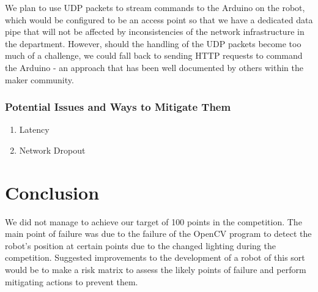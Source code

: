 \documentclass{article}
\begin{document}
We plan to use UDP packets to stream commands to the Arduino on the robot, which would be configured to be an access point so that we have a dedicated data pipe that will not be affected by inconsistencies of the network infrastructure in the department. However, should the handling of the UDP packets become too much of a challenge, we could fall back to sending HTTP requests to command the Arduino - an approach that has been well documented by others within the maker community.

\subsubsection{Potential Issues and Ways to Mitigate Them}
\begin{enumerate}
    \item Latency
    \item Network Dropout
\end{enumerate}

\section{Conclusion}
    \quad We did not manage to achieve our target of 100 points in the competition. The main point of failure was due to the failure of the OpenCV program to detect the robot's position at certain points due to the changed lighting during the competition. Suggested improvements to the development of a robot of this sort would be to make a risk matrix to assess the likely points of failure and perform mitigating actions to prevent them.
\end{document}

